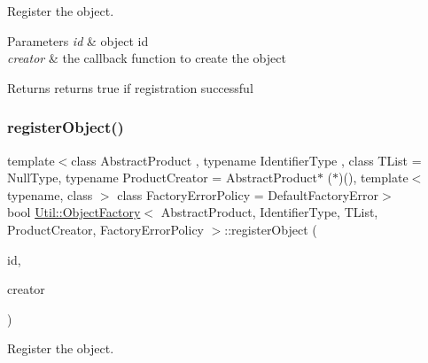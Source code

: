 Register the object. 


\begin{DoxyParams}{Parameters}
{\em id} & object id \\
\hline
{\em creator} & the callback function to create the object \\
\hline
\end{DoxyParams}
\begin{DoxyReturn}{Returns}
returns true if registration successful 
\end{DoxyReturn}
\mbox{\label{classUtil_1_1ObjectFactory_a2eb2f1fc927e23a1a266aa6fa8c6562a}} 
\subsubsection{\texorpdfstring{registerObject()}{registerObject()}\hspace{0.1cm}{\footnotesize\ttfamily [2/2]}}
{\footnotesize\ttfamily template$<$class Abstract\+Product , typename Identifier\+Type , class T\+List  = Null\+Type, typename Product\+Creator  = Abstract\+Product$\ast$ ($\ast$)(), template$<$ typename, class $>$ class Factory\+Error\+Policy = Default\+Factory\+Error$>$ \\
bool \mbox{\hyperlink{classUtil_1_1ObjectFactory}{Util\+::\+Object\+Factory}}$<$ Abstract\+Product, Identifier\+Type, T\+List, Product\+Creator, Factory\+Error\+Policy $>$\+::register\+Object (\begin{DoxyParamCaption}\item[{const Identifier\+Type \&}]{id,  }\item[{Product\+Creator}]{creator }\end{DoxyParamCaption})\hspace{0.3cm}{\ttfamily [inline]}}



Register the object. 


